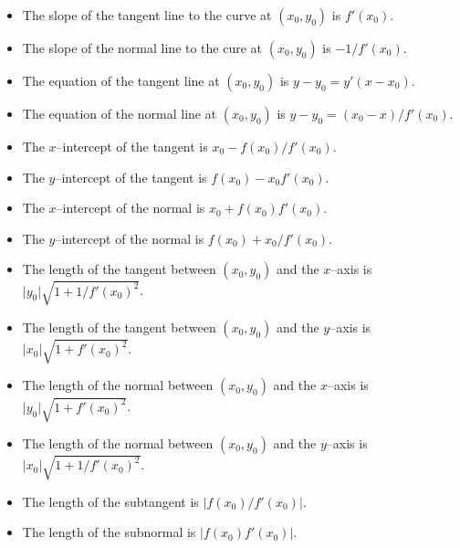 \documentclass[12pt]{article}
\theoremstyle{definition}
\begin{document}
\begin{itemize}
\item The slope of the tangent line to the curve at $(x_0,y_0)$ is $f'(x_0)$.
\item The slope of the normal line to the cure at $(x_0,y_0)$ is $-1/f'(x_0)$.
\item The equation of the tangent line at $(x_0,y_0)$ is $y-y_0=y'(x-x_0)$.
\item The equation of the normal line at $(x_0,y_0)$ is $y-y_0 = (x_0-x)/f'(x_0)$.
\item The $x$--intercept of the tangent is $x_0-f(x_0)/f'(x_0)$.
\item The $y$--intercept of the tangent is $f(x_0)-x_0 f'(x_0)$.
\item The $x$--intercept of the normal is $x_0+f(x_0)f'(x_0)$.
\item The $y$--intercept of the normal is $f(x_0)+x_0/f'(x_0)$.
\item The length of the tangent between $(x_0,y_0)$ and the $x$--axis is $\lvert y_0 \rvert\sqrt{1+1/f'(x_0)^2}$.
\item The length of the tangent between $(x_0,y_0)$ and the $y$--axis is $\lvert x_0 \rvert\sqrt{1+f'(x_0)^2}$.
\item The length of the normal between $(x_0,y_0)$ and the $x$--axis is $\lvert y_0 \rvert\sqrt{1+f'(x_0)^2}$.
\item The length of the normal between $(x_0,y_0)$ and the $y$--axis is $\lvert x_0 \rvert \sqrt{1+1/f'(x_0)^2}$.
\item The length of the subtangent is $\lvert f(x_0)/f'(x_0) \rvert$.
\item The length of the subnormal is $\lvert f(x_0) f'(x_0) \rvert$.
\end{itemize}
\end{document}
